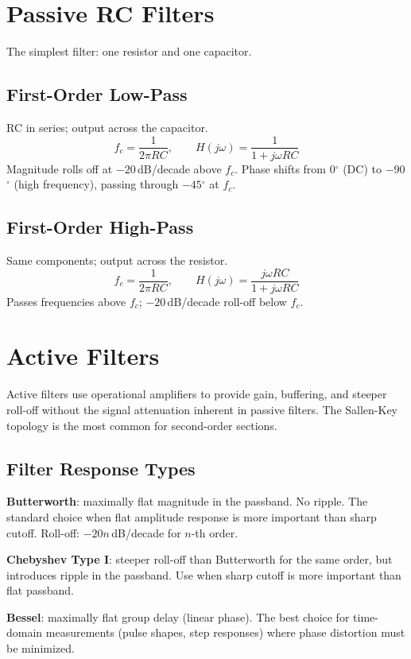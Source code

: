 \documentclass[11pt,letterpaper,twoside,openany]{book}
\providecommand{\ang}[1]{#1\ensuremath{{}^{\circ}}}
\begin{document}
\section{Passive RC Filters}
The simplest filter: one resistor and one capacitor.

\subsection{First-Order Low-Pass}
RC in series; output across the capacitor.
\begin{equation}
f_c = \frac{1}{2\pi RC}, \qquad H(j\omega) = \frac{1}{1 + j\omega RC}
\end{equation}
Magnitude rolls off at $-20$\,dB/decade above $f_c$. Phase shifts from 0\ang{} (DC) to $-90$\ang{} (high frequency), passing through $-45$\ang{} at $f_c$.

\subsection{First-Order High-Pass}
Same components; output across the resistor.
\begin{equation}
f_c = \frac{1}{2\pi RC}, \qquad H(j\omega) = \frac{j\omega RC}{1 + j\omega RC}
\end{equation}
Passes frequencies above $f_c$; $-20$\,dB/decade roll-off below $f_c$.

\section{Active Filters}
Active filters use operational amplifiers to provide gain, buffering, and steeper roll-off without the signal attenuation inherent in passive filters. The Sallen-Key topology is the most common for second-order sections.

\subsection{Filter Response Types}
\textbf{Butterworth}: maximally flat magnitude in the passband. No ripple. The standard choice when flat amplitude response is more important than sharp cutoff. Roll-off: $-20n$\,dB/decade for $n$-th order.

\textbf{Chebyshev Type I}: steeper roll-off than Butterworth for the same order, but introduces ripple in the passband. Use when sharp cutoff is more important than flat passband.

\textbf{Bessel}: maximally flat group delay (linear phase). The best choice for time-domain measurements (pulse shapes, step responses) where phase distortion must be minimized.
\end{document}
